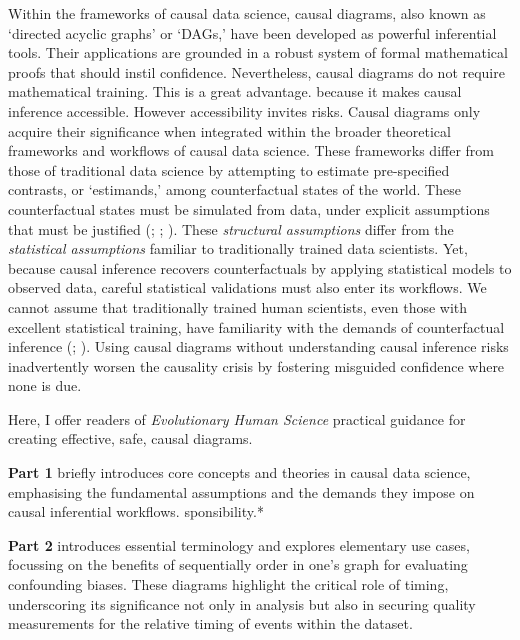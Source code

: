 \documentclass[
  singlecolumn]{article}
\begin{document}
Within the frameworks of causal data science, causal diagrams, also
known as `directed acyclic graphs' or `DAGs,' have been developed as
powerful inferential tools. Their applications are grounded in a robust
system of formal mathematical proofs that should instil confidence.
Nevertheless, causal diagrams do not require mathematical training. This
is a great advantage. because it makes causal inference accessible.
However accessibility invites risks. Causal diagrams only acquire their
significance when integrated within the broader theoretical frameworks
and workflows of causal data science. These frameworks differ from those
of traditional data science by attempting to estimate pre-specified
contrasts, or `estimands,' among counterfactual states of the world.
These counterfactual states must be simulated from data, under explicit
assumptions that must be justified (; ;
). These
\emph{structural assumptions} differ from the \emph{statistical
assumptions} familiar to traditionally trained data scientists. Yet,
because causal inference recovers counterfactuals by applying
statistical models to observed data, careful statistical validations
must also enter its workflows. We cannot assume that traditionally
trained human scientists, even those with excellent statistical
training, have familiarity with the demands of counterfactual inference
(;
). Using causal
diagrams without understanding causal inference risks inadvertently
worsen the causality crisis by fostering misguided confidence where none
is due.

Here, I offer readers of \emph{Evolutionary Human Science} practical
guidance for creating effective, safe, causal diagrams.

\textbf{Part 1} briefly introduces core concepts and theories in causal
data science, emphasising the fundamental assumptions and the demands
they impose on causal inferential workflows. sponsibility.*

\textbf{Part 2} introduces essential terminology and explores elementary
use cases, focussing on the benefits of sequentially order in one's
graph for evaluating confounding biases. These diagrams highlight the
critical role of timing, underscoring its significance not only in
analysis but also in securing quality measurements for the relative
timing of events within the dataset.
\end{document}
